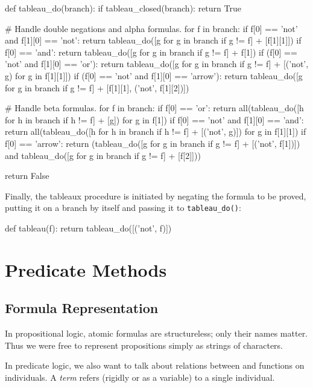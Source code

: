 \documentclass[a4paper,notitlepage]{scrartcl}
\begin{document}
\begin{code}
def tableau_do(branch):
    if tableau_closed(branch):
        return True

    # Handle double negations and alpha formulas.
    for f in branch:
        if f[0] == 'not' and f[1][0] == 'not':
            return tableau_do([g for g in branch if g != f] + [f[1][1]])
        if f[0] == 'and':
            return tableau_do([g for g in branch if g != f] + f[1])
        if (f[0] == 'not' and f[1][0] == 'or'):
            return tableau_do([g for g in branch if g != f] +
                [('not', g) for g in f[1][1]])
        if (f[0] == 'not' and f[1][0] == 'arrow'):
            return tableau_do([g for g in branch if g != f] +
                [f[1][1], ('not', f[1][2])])

    # Handle beta formulas.
    for f in branch:
        if f[0] == 'or':
            return all(tableau_do([h for h in branch if h != f] + [g])
                for g in f[1])
        if f[0] == 'not' and f[1][0] == 'and':
            return all(tableau_do([h for h in branch if h != f] + [('not', g)])
                for g in f[1][1])
        if f[0] == 'arrow':
            return (tableau_do([g for g in branch if g != f] + [('not', f[1])])
                and tableau_do([g for g in branch if g != f] + [f[2]]))

    return False
\end{code}

Finally, the tableaux procedure is initiated by negating the formula to be
proved, putting it on a branch by itself and passing it to
\texttt{tableau\_do()}:

\begin{code}
def tableau(f):
    return tableau_do([('not', f)])
\end{code}

\section{Predicate Methods}

\subsection{Formula Representation}
In propositional logic, atomic formulas are structureless; only their
   names matter.
Thus we were free to represent propositions simply as strings of characters.

In predicate logic, we also want to talk about relations between and functions
   on individuals. 
A \emph{term} refers (rigidly or as a variable) to a single individual.
\end{document}

